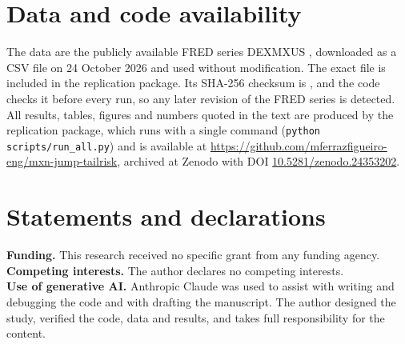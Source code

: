\documentclass[11pt]{article}
\begin{document}
\section*{Data and code availability}\label{sec:data-availability}
The data are the publicly available FRED series DEXMXUS \citep{fred}, downloaded as a CSV file on 24 October 2026 and used without modification. The exact file is included in the replication package. Its SHA-256 checksum is \texttt{}, and the code checks it before every run, so any later revision of the FRED series is detected. All results, tables, figures and numbers quoted in the text are produced by the replication package, which runs with a single command (\texttt{python scripts/run\_all.py}) and is available at \url{https://github.com/mferrazfigueiro-eng/mxn-jump-tailrisk}, archived at Zenodo with DOI \href{https://doi.org/10.5281/zenodo.24353202}{10.5281/zenodo.24353202}.

\section*{Statements and declarations}
\noindent\textbf{Funding.} This research received no specific grant from any funding agency.\\
\textbf{Competing interests.} The author declares no competing interests.\\
\textbf{Use of generative AI.} Anthropic Claude was used to assist with writing and debugging the code and with drafting the manuscript. The author designed the study, verified the code, data and results, and takes full responsibility for the content.



\end{document}
